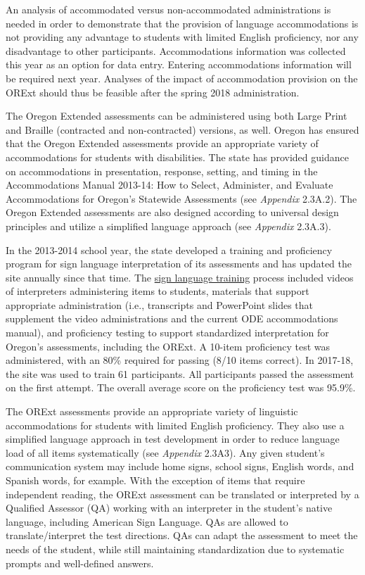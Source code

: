 \documentclass[]{article}
\begin{document}
An analysis of accommodated versus non-accommodated administrations is
needed in order to demonstrate that the provision of language
accommodations is not providing any advantage to students with limited
English proficiency, nor any disadvantage to other participants.
Accommodations information was collected this year as an option for data
entry. Entering accommodations information will be required next year.
Analyses of the impact of accommodation provision on the ORExt should
thus be feasible after the spring 2018 administration.

The Oregon Extended assessments can be administered using both Large
Print and Braille (contracted and non-contracted) versions, as well.
Oregon has ensured that the Oregon Extended assessments provide an
appropriate variety of accommodations for students with disabilities.
The state has provided guidance on accommodations in presentation,
response, setting, and timing in the Accommodations Manual 2013-14: How
to Select, Administer, and Evaluate Accommodations for Oregon's
Statewide Assessments (see \emph{Appendix} 2.3A.2). The Oregon Extended
assessments are also designed according to universal design principles
and utilize a simplified language approach (see \emph{Appendix} 2.3A.3).

In the 2013-2014 school year, the state developed a training and
proficiency program for sign language interpretation of its assessments
and has updated the site annually since that time. The
\color{link}\href{http://lms.brtprojects.org}{sign language training}
\color{black} process included videos of interpreters administering
items to students, materials that support appropriate administration
(i.e., transcripts and PowerPoint slides that supplement the video
administrations and the current ODE accommodations manual), and
proficiency testing to support standardized interpretation for Oregon's
assessments, including the ORExt. A 10-item proficiency test was
administered, with an 80\% required for passing (8/10 items correct). In
2017-18, the site was used to train 61 participants. All participants
passed the assessment on the first attempt. The overall average score on
the proficiency test was 95.9\%.

The ORExt assessments provide an appropriate variety of linguistic
accommodations for students with limited English proficiency. They also
use a simplified language approach in test development in order to
reduce language load of all items systematically (see \emph{Appendix}
2.3A3). Any given student's communication system may include home signs,
school signs, English words, and Spanish words, for example. With the
exception of items that require independent reading, the ORExt
assessment can be translated or interpreted by a Qualified Assessor (QA)
working with an interpreter in the student's native language, including
American Sign Language. QAs are allowed to translate/interpret the test
directions. QAs can adapt the assessment to meet the needs of the
student, while still maintaining standardization due to systematic
prompts and well-defined answers.
\end{document}
